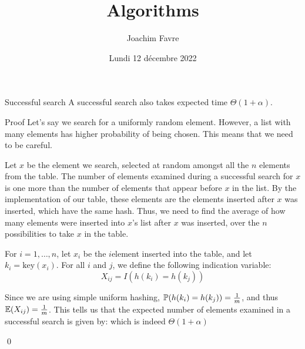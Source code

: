 \documentclass[a4paper]{article}
\title{Algorithms}
\author{Joachim Favre}
\date{Lundi 12 décembre 2022}
\begin{document}
\maketitle


\begin{parag}{Successful search}
    A successful search also takes expected time $\Theta\left(1 + \alpha\right)$.

    \begin{subparag}{Proof}
        Let's say we search for a uniformly random element. However, a list with many elements has higher probability of being chosen. This means that we need to be careful.

        Let $x$ be the element we search, selected at random amongst all the $n$ elements from the table. The number of elements examined during a successful search for $x$ is one more than the number of elements that appear before $x$ in the list. By the implementation of our table, these elements are the elements inserted after $x$ was inserted, which have the same hash. Thus, we need to find the average of how many elements were inserted into $x$'s list after $x$ was inserted, over the $n$ possibilities to take $x$ in the table.

        For $i = 1, \ldots, n$, let $x_i$ be the $i$\Th element inserted into the table, and let $k_i = \text{key}\left(x_i\right)$. For all $i$ and $j$, we define the following indication variable: 
        \[X_{ij} = I\left(h\left(k_i\right) = h\left(k_j\right)\right)\]
        
        Since we are using simple uniform hashing, $\prob\left(h\left(k_i\right) = h\left(k_j\right)\right) = \frac{1}{m}$, and thus $\exval\left(X_{ij}\right) = \frac{1}{m}$. This tells us that the expected number of elements examined in a successful search is given by: 
        which is indeed $\Theta\left(1 + \alpha\right)$
        
        \qed
    \end{subparag}
\end{parag}
\end{document}

